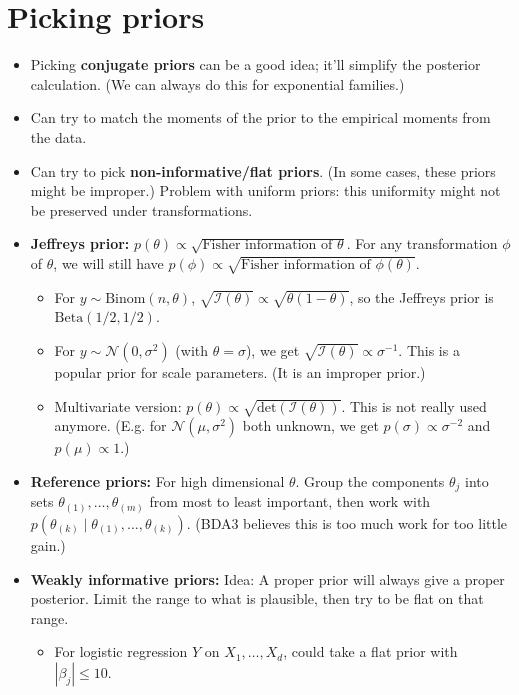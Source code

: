\documentclass[twoside]{article}
\newcommand\calI{\mathcal{I}}
\newcommand\calN{\mathcal{N}}
\newcommand\sg{\sigma}
\def\t{\theta}
\begin{document}
\section{Picking priors}
\begin{itemize}
\item Picking \textbf{conjugate priors} can be a good idea; it'll simplify the posterior calculation. (We can always do this for exponential families.)

\item Can try to match the moments of the prior to the empirical moments from the data.

\item Can try to pick \textbf{non-informative/flat priors}. (In some cases, these priors might be improper.) Problem with uniform priors: this uniformity might not be preserved under transformations.

\item \textbf{Jeffreys prior:} $p(\t) \propto \sqrt{\text{Fisher information of } \t}$. For any transformation $\phi$ of $\t$, we will still have $p(\phi) \propto \sqrt{\text{Fisher information of } \phi(\t)}$.
\begin{itemize}

\item For $y \sim \text{Binom}(n, \t)$, $\sqrt{\calI(\t)} \propto \sqrt{\t(1-\t)}$, so the Jeffreys prior is $\text{Beta}(1/2, 1/2)$.
\item For $y \sim \calN(0, \sg^2)$ (with $\t = \sg$), we get $\sqrt{\calI(\t)} \propto \sg^{-1}$. This is a popular prior for scale parameters. (It is an improper prior.)

\item Multivariate version: $p(\t) \propto \sqrt{\text{det} (\calI(\t))}$. This is not really used anymore. (E.g. for $\calN(\mu, \sg^2)$ both unknown, we get $p(\sg) \propto \sg^{-2}$ and $p(\mu) \propto 1$.)
\end{itemize}

\item \textbf{Reference priors:} For high dimensional $\t$. Group the components $\t_j$ into sets $\t_{(1)}, \dots, \t_{(m)}$ from most to least important, then work with $p(\t_{(k)} \mid \t_{(1)}, \dots, \t_{(k)})$. (BDA3 believes this is too much work for too little gain.)

\item \textbf{Weakly informative priors:} Idea: A proper prior will always give a proper posterior. Limit the range to what is plausible, then try to be flat on that range.
\begin{itemize}
\item For logistic regression $Y$ on $X_1, \dots, X_d$, could take a flat prior with $|\beta_j| \leq 10$.
\end{itemize}

\end{itemize}
\end{document}
